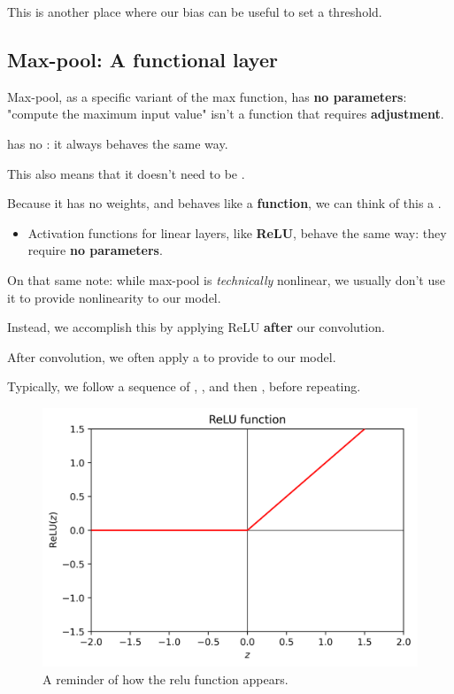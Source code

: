         This is another place where our bias can be useful to set a threshold.
        

    \subsection{Max-pool: A functional layer}

        Max-pool, as a specific variant of the max function, has \textbf{no parameters}: "compute the maximum input value" isn't a function that requires \textbf{adjustment}.\\

        \begin{concept}
             has no : it always behaves the same way.

            This also means that it doesn't need to be .
        \end{concept}

        Because it has no weights, and behaves like a \textbf{function}, we can think of this a .

        \begin{itemize}
            \item Activation functions for linear layers, like \textbf{ReLU}, behave the same way: they require \textbf{no parameters}.
        \end{itemize}

        On that same note: while max-pool is \textit{technically} nonlinear, we usually don't use it to provide nonlinearity to our model.

        Instead, we accomplish this by applying ReLU \textbf{after} our convolution.\\

        \begin{concept}
            After convolution, we often apply a  to provide  to our model.

            Typically, we follow a sequence of , , and then , before repeating.
        \end{concept}

        \begin{figure}[H]
            \centering
            \includegraphics[width=.3\textwidth]{images/nn_images/relu_fn.png}
            
            \caption*{A reminder of how the relu function appears.}
        \end{figure}
        

